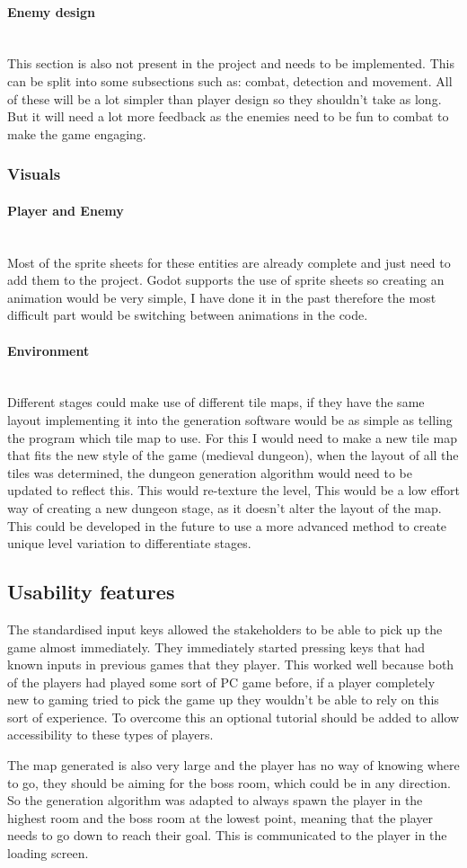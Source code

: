 \documentclass{article}
\newcommand{\parBr}{\vspace{5mm}}%
\newcommand{\myparagraph}[1]{\paragraph{#1}\mbox{}\\} %
\begin{document}
\myparagraph{Enemy design}
This section is also not present in the project and needs to be implemented. This can be split into some subsections such as: combat, detection and movement. All of these will be a lot simpler than player design so they shouldn't take as long. But it will need a lot more feedback as the enemies need to be fun to combat to make the game engaging.

\subsubsection{Visuals}

\myparagraph{Player and Enemy}
Most of the sprite sheets for these entities are already complete and just need to add them to the project. Godot supports the use of sprite sheets so creating an animation would be very simple, I have done it in the past therefore the most difficult part would be switching between animations in the code.

\myparagraph{Environment}
Different stages could make use of different tile maps, if they have the same layout implementing it into the generation software would be as simple as telling the program which tile map to use. For this I would need to make a new tile map that fits the new style of the game (medieval dungeon), when the layout of all the tiles was determined, the dungeon generation algorithm would need to be updated to reflect this. This would re-texture the level, This would be a low effort way of creating a new dungeon stage, as it doesn't alter the layout of the map. This could be developed in the future to use a more advanced method to create unique level variation to differentiate stages.

\subsection{Usability features}
The standardised input keys allowed the stakeholders to be able to pick up the game almost immediately. They immediately started pressing keys that had known inputs in previous games that they player. This worked well because both of the players had played some sort of PC game before, if a player completely new to gaming tried to pick the game up they wouldn't be able to rely on this sort of experience. To overcome this an optional tutorial should be added to allow accessibility to these types of players.

\parBr

The map generated is also very large and the player has no way of knowing where to go, they should be aiming for the boss room, which could be in any direction. So the generation algorithm was adapted to always spawn the player in the highest room and the boss room at the lowest point, meaning that the player needs to go down to reach their goal. This is communicated to the player in the loading screen.
\end{document}
